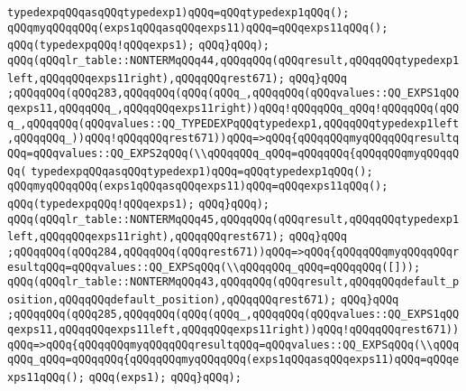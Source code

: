 \verb|typedexpqQQqasqQQqtypedexp1)qQQq=qQQqtypedexp1qQQq();|\newline
\verb|qQQqmyqQQqqQQq(exps1qQQqasqQQqexps11)qQQq=qQQqexps11qQQq();|\newline
\verb|qQQq(typedexpqQQq!qQQqexps1);|\newline
\verb|qQQq}qQQq);|\newline
\verb|qQQq(qQQqlr_table::NONTERMqQQq44,qQQqqQQq(qQQqresult,qQQqqQQqtypedexp1left,qQQqqQQqexps11right),qQQqqQQqrest671);|\newline
\verb|qQQq}qQQq|\newline
\verb|;qQQqqQQq(qQQq283,qQQqqQQq(qQQq(qQQq_,qQQqqQQq(qQQqvalues::QQ_EXPS1qQQqexps11,qQQqqQQq_,qQQqqQQqexps11right))qQQq!qQQqqQQq_qQQq!qQQqqQQq(qQQq_,qQQqqQQq(qQQqvalues::QQ_TYPEDEXPqQQqtypedexp1,qQQqqQQqtypedexp1left,qQQqqQQq_))qQQq!qQQqqQQqrest671))qQQq=>qQQq{qQQqqQQqmyqQQqqQQqresultqQQq=qQQqvalues::QQ_EXPS2qQQq(\\qQQqqQQq_qQQq=qQQqqQQq{qQQqqQQqmyqQQqqQQq(|\newline
\verb|typedexpqQQqasqQQqtypedexp1)qQQq=qQQqtypedexp1qQQq();|\newline
\verb|qQQqmyqQQqqQQq(exps1qQQqasqQQqexps11)qQQq=qQQqexps11qQQq();|\newline
\verb|qQQq(typedexpqQQq!qQQqexps1);|\newline
\verb|qQQq}qQQq);|\newline
\verb|qQQq(qQQqlr_table::NONTERMqQQq45,qQQqqQQq(qQQqresult,qQQqqQQqtypedexp1left,qQQqqQQqexps11right),qQQqqQQqrest671);|\newline
\verb|qQQq}qQQq|\newline
\verb|;qQQqqQQq(qQQq284,qQQqqQQq(qQQqrest671))qQQq=>qQQq{qQQqqQQqmyqQQqqQQqresultqQQq=qQQqvalues::QQ_EXPSqQQq(\\qQQqqQQq_qQQq=qQQqqQQq([]));|\newline
\verb|qQQq(qQQqlr_table::NONTERMqQQq43,qQQqqQQq(qQQqresult,qQQqqQQqdefault_position,qQQqqQQqdefault_position),qQQqqQQqrest671);|\newline
\verb|qQQq}qQQq|\newline
\verb|;qQQqqQQq(qQQq285,qQQqqQQq(qQQq(qQQq_,qQQqqQQq(qQQqvalues::QQ_EXPS1qQQqexps11,qQQqqQQqexps11left,qQQqqQQqexps11right))qQQq!qQQqqQQqrest671))qQQq=>qQQq{qQQqqQQqmyqQQqqQQqresultqQQq=qQQqvalues::QQ_EXPSqQQq(\\qQQqqQQq_qQQq=qQQqqQQq{qQQqqQQqmyqQQqqQQq(exps1qQQqasqQQqexps11)qQQq=qQQqexps11qQQq();|\newline
\verb|qQQq(exps1);|\newline
\verb|qQQq}qQQq);|\newline
